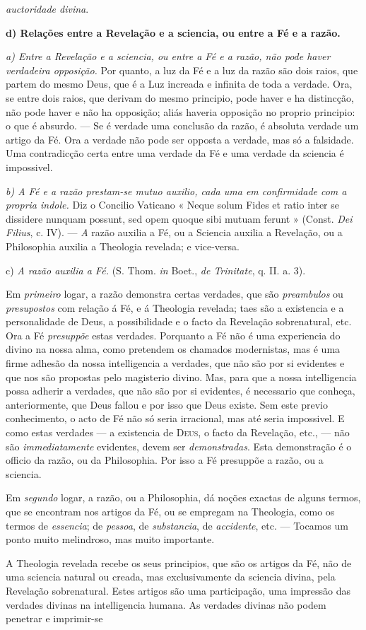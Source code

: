 \emph{auctoridade divina}.\par \textbf{d) Relações entre a Revelação e a sciencia, ou entre a Fé e a razão.}\par \emph{a) Entre a Revelação e a sciencia, ou entre a Fé e a razão, não pode haver verdadeira opposição.} Por quanto, a luz da Fé e a luz da razão são dois raios, que partem do mesmo Deus, que é a Luz increada e infinita de toda a verdade. Ora, se entre dois raios, que derivam do mesmo principio, pode haver e ha distincção, não pode haver e não ha opposição; aliás haveria opposição no proprio principio: o que é absurdo. --- Se é verdade uma conclusão da razão, é absoluta verdade um artigo da Fé. Ora a verdade não pode ser opposta a verdade, mas só a falsidade. Uma contradicção certa entre uma verdade da Fé e uma verdade da sciencia é impossivel.\par \emph{b) A Fé e a razão prestam-se mutuo auxilio, cada uma em confirmidade com a propria indole.} Diz o Concilio Vaticano « Neque solum Fides et ratio inter se dissidere nunquam possunt, sed opem quoque sibi mutuam ferunt » (Const. \emph{Dei Filius}, c. IV). --- \emph{A} razão auxilia a Fé, ou a Sciencia auxilia a Revelação, ou a Philosophia auxilia a Theologia revelada; e vice-versa.\par c) \emph{A razão auxilia a Fé.} (S. Thom. \emph{in} Boet., \emph{de Trinitate}, q. II. a. 3).\par Em \emph{primeiro} logar, a razão demonstra certas verdades, que são \emph{preambulos} ou \emph{presupostos} com relação á Fé, e á Theologia revelada; taes são a existencia e a personalidade de Deus, a possibilidade e o facto da Revelação sobrenatural, etc. Ora a Fé \emph{presuppõe} estas verdades. Porquanto a Fé não é uma experiencia do divino na nossa alma, como pretendem os chamados modernistas, mas é uma firme adhesão da nossa intelligencia a verdades, que não são por si evidentes e que nos são propostas pelo magisterio divino. Mas, para que a nossa intelligencia possa adherir a verdades, que não são por si evidentes, é necessario que conheça, anteriormente, que Deus fallou e por isso que Deus existe. Sem este previo conhecimento, o acto de Fé não só seria irracional, mas até seria impossivel. E como estas verdades --- a existencia de \textsc{Deus}, o facto da Revelação, etc., --- não são \emph{immediatamente} evidentes, devem ser \emph{demonstradas}. Esta demonstração é o officio da razão, ou da Philosophia. Por isso a Fé presuppõe a razão, ou a sciencia.\par Em \emph{segundo} logar, a razão, ou a Philosophia, dá noções exactas de alguns termos, que se encontram nos artigos da Fé, ou se empregam na Theologia, como os termos de \emph{essencia}; de \emph{pessoa}, de \emph{substancia}, de \emph{accidente}, etc. --- Tocamos um ponto muito melindroso, mas muito importante.\par A Theologia revelada recebe os seus principios, que são os artigos da Fé, não de uma sciencia natural ou creada, mas exclusivamente da sciencia divina, pela Revelação sobrenatural. Estes artigos são uma participação, uma impressão das verdades divinas na intelligencia humana. As verdades divinas não podem penetrar e imprimir-se 